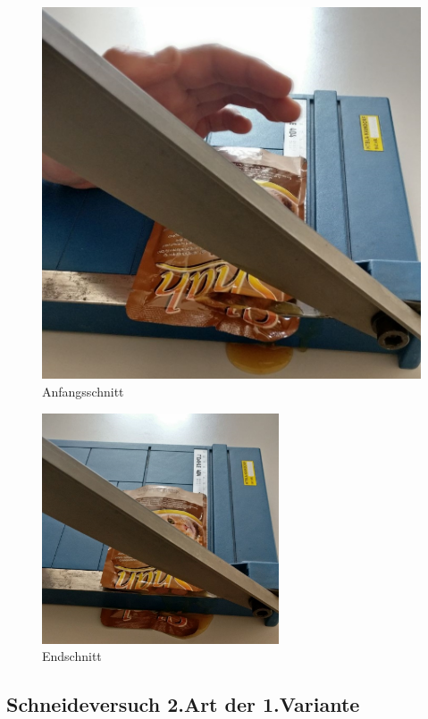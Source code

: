 \begin{figure}[H]
\begin{minipage}[hbt]{.5\linewidth}
      \includegraphics[width=\linewidth]{Bilder/Schneideversuch_1.Art/Anfangsschnitt}
      \caption{Anfangsschnitt}
   \end{minipage}
\end{figure}

\begin{figure}[H]
\begin{center}
\includegraphics[width=7cm]{Bilder/Schneideversuch_1.Art/Endschnitt}
\caption{Endschnitt}
\end{center}
\end{figure}
\newpage
\subsection{Schneideversuch 2.Art der 1.Variante}

